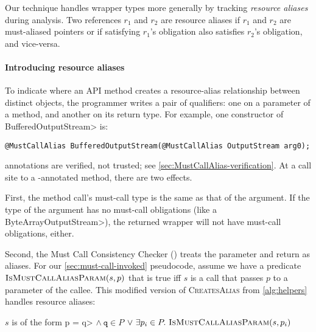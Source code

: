 Our technique handles wrapper types more generally by tracking \emph{resource
aliases} during analysis.  Two references $r_1$ and $r_2$ are resource aliases
if $r_1$ and $r_2$ are must-aliased pointers or if
satisfying $r_1$'s \MustCall obligation also satisfies $r_2$'s
  obligation, and vice-versa.

\paragraph{Introducing resource aliases}
To indicate where an API method creates a resource-alias
relationship between distinct objects, the programmer writes a pair of 
\MustCallAlias qualifiers:  one on a parameter
of a method, and another on its return type.
For example, one constructor of \<BufferedOutputStream> is:
\begin{lstlisting}
@MustCallAlias BufferedOutputStream(@MustCallAlias OutputStream arg0);
\end{lstlisting}

\noindent
\MustCallAlias annotations are verified, not trusted; see \cref{sec:MustCallAlias-verification}.
At a call site to a \MustCallAlias-annotated method, there are two effects.

First, the method call's must-call type is the same as that of the
argument.  If the type of the argument has no must-call obligations (like a
\<ByteArrayOutputStream>), the returned wrapper will not have must-call
obligations, either.

Second,
the Must Call Consistency Checker
() treats the \MustCallAlias parameter and return as
aliases.  For our \cref{sec:must-call-invoked} pseudocode, assume we have a
predicate $\textsc{IsMust\-CallAliasParam}(s,p)$ that is true iff $s$ is a call that
passes $p$ to a \MustCallAlias parameter of the callee.
This modified
version of \textsc{CreatesAlias} from \cref{alg:helpers} handles resource aliases:
\begin{algorithmic}
    \State \Return $s$ is of the form \<p = q> $\wedge\ \mathtt{q} \in P$ \newline
         \hspace*{4.5em} $\vee\ \exists p_i \in P.\ \textsc{IsMustCallAliasParam}(s,p_i)$ 
    \EndProcedure
\end{algorithmic}


